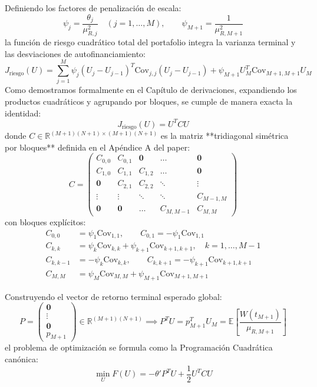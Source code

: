 \documentclass[11pt,a4paper]{report}
\numberwithin{equation}{chapter}
\begin{document}
Definiendo los factores de penalización de escala:
\begin{equation}
    \psi_j = \frac{\theta_j}{\mu_{R,j}^2} \quad (j = 1, \dots, M), \qquad \psi_{M+1} = \frac{1}{\mu_{R,M+1}^2}
\end{equation}
la función de riesgo cuadrático total del portafolio integra la varianza terminal y las desviaciones de autofinanciamiento:
\begin{equation}
    J_{\mathrm{riesgo}}(U) = \sum_{j=1}^M \psi_j (U_j - U_{j-1})^T \mathrm{Cov}_{j,j} (U_j - U_{j-1}) + \psi_{M+1} U_M^T \mathrm{Cov}_{M+1,M+1} U_M
\end{equation}
Como demostramos formalmente en el Capítulo de derivaciones, expandiendo los productos cuadráticos y agrupando por bloques, se cumple de manera exacta la identidad:
\begin{equation}
    J_{\mathrm{riesgo}}(U) = U^T C U
\end{equation}
donde $C \in \mathbb{R}^{(M+1)(N+1) \times (M+1)(N+1)}$ es la matriz **tridiagonal simétrica por bloques** definida en el Apéndice A del paper:
\begin{equation}
    C = \begin{pmatrix}
        C_{0,0} & C_{0,1} & \mathbf{0} & \dots & \mathbf{0} \\
        C_{1,0} & C_{1,1} & C_{1,2} & \dots & \mathbf{0} \\
        \mathbf{0} & C_{2,1} & C_{2,2} & \ddots & \vdots \\
        \vdots & \vdots & \ddots & \ddots & C_{M-1,M} \\
        \mathbf{0} & \mathbf{0} & \dots & C_{M,M-1} & C_{M,M}
    \end{pmatrix}
\end{equation}
con bloques explícitos:
\begin{align}
    C_{0,0} &= \psi_1 \mathrm{Cov}_{1,1}, \qquad C_{0,1} = -\psi_1 \mathrm{Cov}_{1,1} \\
    C_{k,k} &= \psi_k \mathrm{Cov}_{k,k} + \psi_{k+1} \mathrm{Cov}_{k+1,k+1}, \quad k = 1, \dots, M-1 \\
    C_{k,k-1} &= -\psi_k \mathrm{Cov}_{k,k}, \qquad C_{k,k+1} = -\psi_{k+1} \mathrm{Cov}_{k+1,k+1} \\
    C_{M,M} &= \psi_M \mathrm{Cov}_{M,M} + \psi_{M+1} \mathrm{Cov}_{M+1,M+1}
\end{align}

Construyendo el vector de retorno terminal esperado global:
\begin{equation}
    P = \begin{pmatrix} \mathbf{0} \\ \vdots \\ \mathbf{0} \\ p_{M+1} \end{pmatrix} \in \mathbb{R}^{(M+1)(N+1)} \implies P^T U = p_{M+1}^T U_M = \mathbb{E}\left[ \frac{W(t_{M+1})}{\mu_{R,M+1}} \right]
\end{equation}
el problema de optimización se formula como la Programación Cuadrática canónica:
\begin{equation}
    \boxed{\min_U F(U) = -\theta' P^T U + \frac{1}{2} U^T C U} \label{eq:QP_canonica_global}
\end{equation}
\end{document}
